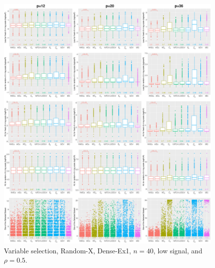 \begin{figure}[!ht]
\centering
\includegraphics[width=\textwidth]{figures/supplement/randomx/subset_selection/Dense-Ex1_n40_lsnr_rho05.eps}
\caption{Variable selection, Random-X, Dense-Ex1, $n=40$, low signal, and $\rho=0.5$.}
\end{figure}
\clearpage
